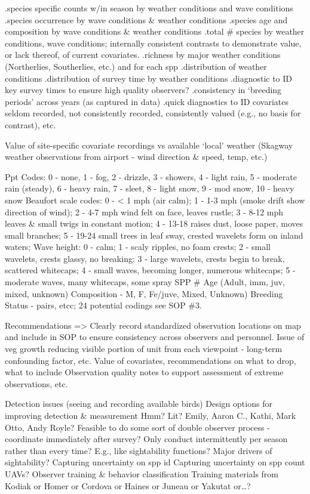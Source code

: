 \documentclass[]{article}
\begin{document}
.species specific counts w/in season by weather conditions and wave
conditions .species occurrence by wave conditions \& weather conditions
.species age and composition by wave conditions \& weather conditions
.total \# species by weather conditions, wave conditions; internally
consistent contrasts to demonstrate value, or lack thereof, of current
covariates. .richness by major weather conditions (Northerlies,
Southerlies, etc.) and for each spp .distribution of weather conditions
.distribution of survey time by weather conditions .diagnostic to ID key
survey times to ensure high quality observers? .consistency in `breeding
periods' across years (as captured in data) .quick diagnostics to ID
covariates seldom recorded, not consistently recorded, consistently
valued (e.g., no basis for contrast), etc.

Value of site-specific covariate recordings vs available `local' weather
(Skagway weather observations from airport - wind direction \& speed,
temp, etc.)

Ppt Codes: 0 - none, 1 - fog, 2 - drizzle, 3 - showers, 4 - light rain,
5 - moderate rain (steady), 6 - heavy rain, 7 - sleet, 8 - light snow, 9
- mod snow, 10 - heavy snow Beaufort scale codes: 0 - \textless{} 1 mph
(air calm); 1 - 1-3 mph (smoke drift show direction of wind); 2 - 4-7
mph wind felt on face, leaves rustle; 3 - 8-12 mph leaves \& small twigs
in constant motion; 4 - 13-18 raises dust, loose paper, moves small
branches; 5 - 19-24 small trees in leaf sway, crested wavelets form on
inland waters; Wave height: 0 - calm; 1 - scaly ripples, no foam crests;
2 - small wavelets, crests glassy, no breaking; 3 - large wavelets,
crests begin to break, scattered whitecaps; 4 - small waves, becoming
longer, numerous whitecaps; 5 - moderate waves, many whitecaps, some
spray SPP \# Age (Adult, imm, juv, mixed, unknown) Composition - M, F,
Fe/juve, Mixed, Unknown) Breeding Status - pairs, etcc; 24 potential
codings see SOP \#3.

Recommendations =\textgreater{} Clearly record standardized observation
locations on map and include in SOP to ensure consistency across
observers and personnel. Issue of veg growth reducing visible portion of
unit from each viewpoint - long-term confounding factor, etc. Value of
covariates, recommendations on what to drop, what to include Observation
quality notes to support assessment of extreme observations, etc.

Detection issues (seeing and recording available birds) Design options
for improving detection \& measurement Hmm? Lit? Emily, Aaron C., Kathi,
Mark Otto, Andy Royle? Feasible to do some sort of double observer
process - coordinate immediately after survey? Only conduct
intermittently per season rather than every time? E.g., like
sightability functions? Major drivers of sightability? Capturing
uncertainty on spp id Capturing uncertainty on spp count UAVs? Observer
training \& behavior classification Training materials from Kodiak or
Homer or Cordova or Haines or Juneau or Yakutat or\ldots{}?
\end{document}
